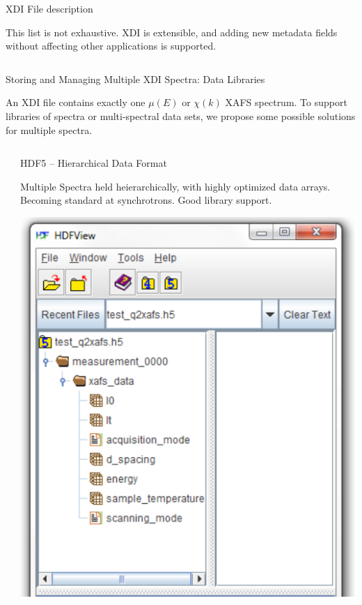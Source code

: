 \documentclass[final]{beamer}
\begin{document}
\begin{frame}{}
\begin{columns}[t]
\begin{column}{.42\linewidth}
\begin{block}{\large XDI File description}
         \hspace{3mm}

         This list is not exhaustive.  XDI is extensible, and adding new
         metadata fields without affecting other applications is supported.


       \end{block}
     \end{column}
   \end{columns}

   \begin{block}{\large Storing and Managing Multiple XDI Spectra:  Data Libraries}

     An XDI file contains exactly one $\mu(E)$ or $\chi(k)$ XAFS
     spectrum.  To support libraries of spectra or multi-spectral data
     sets, we propose some possible solutions for multiple spectra.

   \end{block}

   \vspace{-13mm}

    \begin{columns}[t]
      \begin{column}{.01\linewidth}
      \end{column}
      \begin{column}{.31\linewidth}
        \begin{block}{HDF5 -- Hierarchical Data Format}

          \justifying Multiple Spectra held heierarchically, with highly
          optimized data arrays.  Becoming standard at synchrotrons.  Good
          library support.

         \vspace{9mm}

         \begin{center}
           \includegraphics[width=0.6\linewidth]{hdf5.png}
         \end{center}


\end{block}
\end{column}
\end{columns}
\end{frame}
\end{document}
